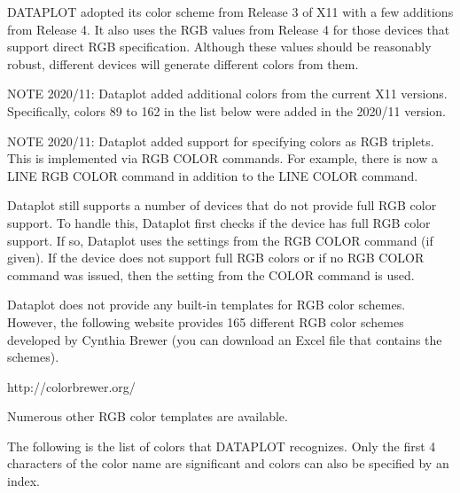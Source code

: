DATAPLOT adopted its color scheme from Release 3 of X11 with a few
additions from Release 4.  It also uses the RGB values from Release 4
for those devices that support direct RGB specification.  Although these
values should be reasonably robust, different devices will generate
different colors from them.

NOTE 2020/11: Dataplot added additional colors from the current X11
              versions.  Specifically, colors 89 to 162 in the list
              below were added in the 2020/11 version.
 
NOTE 2020/11: Dataplot added support for specifying colors as RGB
              triplets.  This is implemented via RGB COLOR commands.
              For example, there is now a LINE RGB COLOR command in
              addition to the LINE COLOR command.

              Dataplot still supports a number of devices that do not
              provide full RGB color support.  To handle this, Dataplot
              first checks if the device has full RGB color support.
              If so, Dataplot uses the settings from the RGB COLOR
              command (if given).  If the device does not support full
              RGB colors or if no RGB COLOR command was issued, then
              the setting from the COLOR command is used.

              Dataplot does not provide any built-in templates for RGB
              color schemes.  However, the following website provides
              165 different RGB color schemes developed by Cynthia Brewer
              (you can download an Excel file that contains the schemes).

                   http://colorbrewer.org/

              Numerous other RGB color templates are available.

The following is the list of colors that DATAPLOT recognizes.  Only the
first 4 characters of the color name are significant and colors can
also be specified by an index.
 
